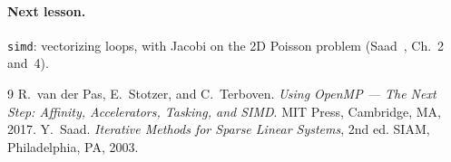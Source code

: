 \documentclass[11pt,a4paper]{article}
\let\origtexttt\texttt
\renewcommand{\texttt}[1]{\textcolor{black!60}{\origtexttt{#1}}}
\begin{document}
\paragraph{Next lesson.} \texttt{simd}: vectorizing loops, with Jacobi on the 2D Poisson
problem (Saad~\cite{saad}, Ch.~2 and~4).

\begin{thebibliography}{9}
 R.~van der Pas, E.~Stotzer, and C.~Terboven. \emph{Using OpenMP --- The Next
  Step: Affinity, Accelerators, Tasking, and SIMD}. MIT Press, Cambridge, MA, 2017.
 Y.~Saad. \emph{Iterative Methods for Sparse Linear Systems}, 2nd ed. SIAM,
  Philadelphia, PA, 2003.
\end{thebibliography}
\end{document}
